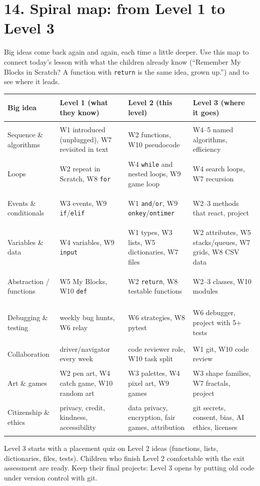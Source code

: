 \documentclass[level=2,teacher]{kidscode}
\begin{document}

\section{14. Spiral map: from Level 1 to Level 3}
Big ideas come back again and again, each time a little deeper. Use this map to connect today's
lesson with what the children already know (\enquote{Remember My Blocks in Scratch? A function
with \texttt{return} is the same idea, grown up.}) and to see where it leads.

{\small
\begin{longtable}{@{}>{\bfseries\raggedright\arraybackslash}p{2.8cm}>{\raggedright\arraybackslash}p{3.7cm}>{\raggedright\arraybackslash}p{4.1cm}>{\raggedright\arraybackslash}p{3.9cm}@{}}
\toprule
Big idea & Level 1 (what they know) & Level 2 (this level) & Level 3 (where it goes) \\ \midrule\endhead
Sequence \& algorithms & W1 introduced (unplugged), W7 revisited in text & W2 functions, W10 pseudocode & W4--5 named algorithms, efficiency \\
Loops & W2 repeat in Scratch, W8 \texttt{for} & W4 \texttt{while} and nested loops, W9 game loop & W4 search loops, W7 recursion \\
Events \& conditionals & W3 events, W9 \texttt{if}/\texttt{elif} & W1 \texttt{and}/\texttt{or}, W9 \texttt{onkey}/\texttt{ontimer} & W2--3 methods that react, project \\
Variables \& data & W4 variables, W9 \texttt{input} & W1 types, W3 lists, W5 dictionaries, W7 files & W2 attributes, W5 stacks/queues, W7 grids, W8 CSV data \\
Abstraction / functions & W5 My Blocks, W10 \texttt{def} & W2 \texttt{return}, W8 testable functions & W2--3 classes, W10 modules \\
Debugging \& testing & weekly bug hunts, W6 relay & W6 strategies, W8 pytest & W6 debugger, project with 5+ tests \\
Collaboration & driver/navigator every week & code reviewer role, W10 task split & W1 git, W10 code review \\
Art \& games & W2 pen art, W4 catch game, W10 random art & W3 palettes, W4 pixel art, W9 games & W3 shape families, W7 fractals, project \\
Citizenship \& ethics & privacy, credit, kindness, accessibility & data privacy, encryption, fair games, attribution & git secrets, consent, bias, AI ethics, licenses \\
\bottomrule
\end{longtable}}

\begin{tip}
Level 3 starts with a placement quiz on Level 2 ideas (functions, lists, dictionaries, files,
tests). Children who finish Level 2 comfortable with the exit assessment are ready. Keep their
final projects: Level 3 opens by putting old code under version control with git.
\end{tip}
\end{document}
